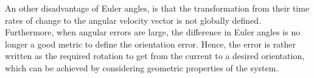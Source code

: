 An other disadvantage of Euler angles, is that the transformation from their time rates of change to the angular velocity vector is not globally defined. Furthermore, when angular errors are large, the difference in Euler angles is no longer a good metric to define the orientation error. 
Hence, the error is rather written as the required rotation to get from the current to a desired orientation, which can be achieved by considering geometric properties of the system.
%
%

